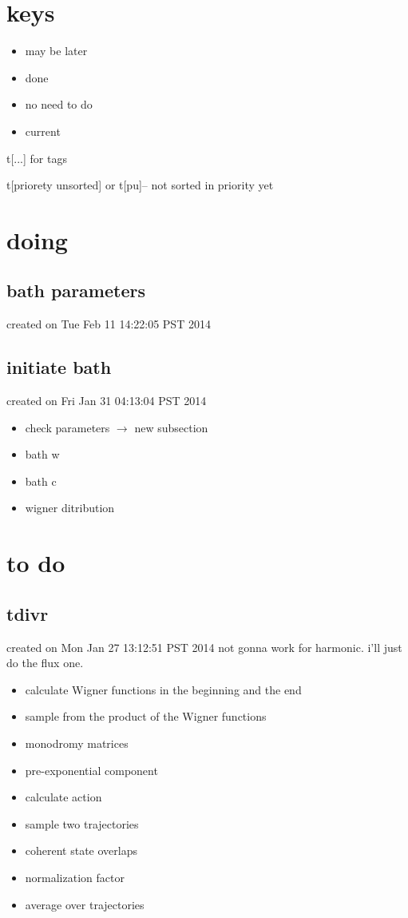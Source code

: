 \documentclass{article}
\let\Item\item
\renewcommand\item{\normalcolor\Item}
\newcommand\ml{\color[RGB]{153, 150, 204}} %
\newcommand\nn{\color[RGB]{124, 124, 255}} %
\newcommand\done{\color[RGB]{129, 180, 185} \ding{52} }
\newcommand\now{\color[RGB]{255, 0, 0}} %
\begin{document}
\section{keys}
\begin{itemize}
  \item \ml may be later
  \item \done done
  \item \nn no need to do
  \item \now current 
\end{itemize}

t[...] for tags

t[priorety unsorted] or t[pu]-- not sorted in priority yet

\section{doing}
\subsection{bath parameters}
created on Tue Feb 11 14:22:05 PST 2014
\label{sub:bath_parameters}

\subsection{initiate bath}
created on Fri Jan 31 04:13:04 PST 2014
\label{sub:initiate_bath}
\begin{itemize}
  \item \done check parameters $\to$ new subsection
  \item bath w
  \item bath c
  \item wigner ditribution
\end{itemize}
\section{to do}
\subsection{tdivr}
created on Mon Jan 27 13:12:51 PST 2014
\label{sub:tdivr}
not gonna work for harmonic. i'll just do the flux one.
\begin{itemize}
  \item \now calculate Wigner functions in the beginning and the end
  \item sample from the product of the Wigner functions
  \item monodromy matrices
  \item pre-exponential component
  \item calculate action
  \item sample two trajectories
  \item coherent state overlaps
  \item normalization factor
  \item average over trajectories
\end{itemize}
\end{document}
